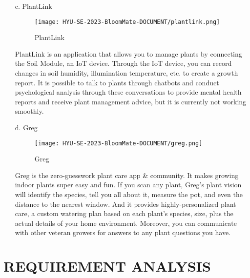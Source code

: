 \documentclass[conference, a4paper]{IEEEtran}
\begin{document}
\begin{enumerate}
\item[c.]PlantLink

\begin{figure}[h]
\texttt{[image: HYU-SE-2023-BloomMate-DOCUMENT/plantlink.png]}
\label{fig:PlantLinkIoT}
\caption{PlantLink} 
\end{figure}

\item[]PlantLink is an application that allows you to manage plants by connecting the Soil Module, an IoT device. Through the IoT device, you can record changes in soil humidity, illumination temperature, etc. to create a growth report. It is possible to talk to plants through chatbots and conduct psychological analysis through these conversations to provide mental health reports and receive plant management advice, but it is currently not working smoothly. \\

\newpage

\item[d.]Greg

\begin{figure}[h]
\texttt{[image: HYU-SE-2023-BloomMate-DOCUMENT/greg.png]}
\label{fig:Greg}
\caption{Greg} 
\end{figure}

\item[]Greg is the zero-guesswork plant care app & community. It makes growing indoor plants super easy and fun. If you scan any plant, Greg’s plant vision will identify the species, tell you all about it, measure the pot, and even the distance to the nearest window. And it provides highly-personalized plant care, a custom watering plan based on each plant’s species, size, plus the actual details of your home environment. Moreover, you can communicate with other veteran growers for answers to any plant questions you have. \\
\end{enumerate}

\section{REQUIREMENT ANALYSIS}
\end{document}
